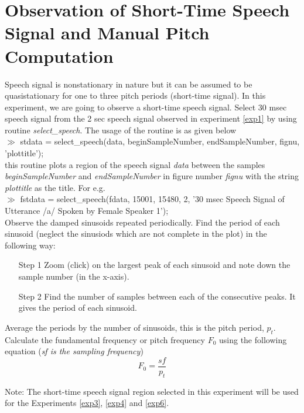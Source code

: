 \section{Observation of Short-Time Speech Signal and Manual Pitch
Computation}
\label{exp2}
Speech signal is nonstationary in nature but it can be assumed to be
quasistationary for one to three pitch periods (short-time signal). In
this experiment, we
are going to observe a short-time speech signal. Select 30 msec speech
signal from the 2 sec speech signal observed in experiment \ref{exp1}
by using routine {\it
select\_speech}. The usage of the routine is as given below\\[2ex]
\noindent
$\gg$ stdata = select\_speech(data, beginSampleNumber, endSampleNumber,
fignu, 'plottitle');\\[1ex]
\noindent
this routine plots a region of the speech signal {\it data} between the
samples {\it beginSampleNumber} and {\it endSampleNumber} in figure
number {\it fignu} with the string {\it plottitle} as the title. For
e.g.\\[2ex]
\noindent
$\gg$ fstdata = select\_speech(fdata, 15001, 15480, 2, '30 msec Speech
Signal of Utterance /a/ Spoken by Female Speaker 1');\\

\noindent
Observe the damped sinusoids repeated periodically. Find the period of
each sinusoid (neglect the sinusiods which are not complete in the
plot) in the following way:
\begin{itemize}
	\item [Step 1] Zoom (click) on the largest peak of each sinusoid and
note down the sample number (in the x-axis).
	\item [Step 2] Find the number of samples between each of the
consecutive peaks. It gives the period of each sinusoid.
\end{itemize}

Average the periods by the number of sinusoids, this is the 
pitch period, $p_{t}$. Calculate the fundamental frequency or pitch
frequency $F_{0}$ using the following equation ({\it sf is the
sampling frequency})
\begin{equation}
\label{peq}
	F_{0} = \frac{sf}{p_{t}}
\end{equation}

\noindent
Note: The short-time speech signal region selected in this experiment
will be used for the Experiments \ref{exp3}, \ref{exp4} and \ref{exp6}. 

